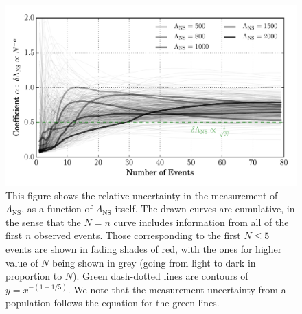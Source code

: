\documentclass[aps,prd,amsmath,floats,floatfix, twocolumn,
superscriptaddress,nofootinbib,showpacs]{revtex4-1}
\newcommand{\prayush}{\textcolor{red!40!black}}
\newcommand{\lambdans}{\Lambda_\mathrm{NS}}
\begin{document}
% 
\begin{figure}
\centering    
\includegraphics[width=1.05\columnwidth]{plots/PowerLawCoefficient_LambdaErrorvsN_vs_N.pdf}
\caption{This figure shows the relative uncertainty in the measurement of $\lambdans$,
as a function of $\lambdans$ itself. The drawn curves are cumulative, in the sense 
that the $N=n$ curve includes information from all of the first $n$ observed events.
Those corresponding to the first $N\leq 5$ events are shown in fading shades of red,
with the ones for higher value of $N$ being shown in grey (going from light to dark in
proportion to $N$).
Green dash-dotted lines are contours of $y=x^{-(1+1/5)}$.
% 
\prayush{We note that the measurement uncertainty from a population follows the
equation for the green lines.}
% 
}
\label{fig:TT_PowerLawLambdaErrorVsN}
\end{figure}
\end{document}
